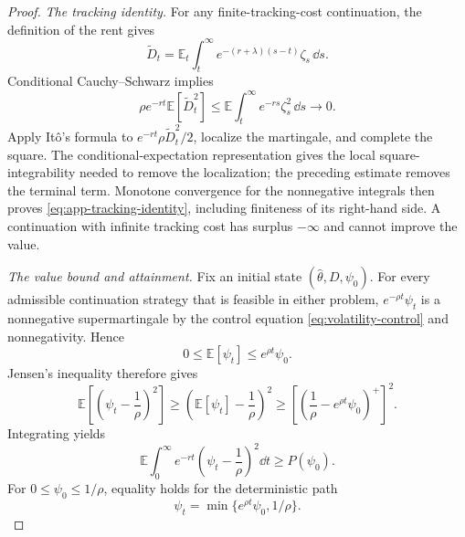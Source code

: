 \documentclass[12pt]{article}
\newcommand{\E}{\mathbb{E}}
\newcommand{\hth}{\hat\theta}
\begin{document}
\begin{proof}

\emph{The tracking identity.}
For any finite-tracking-cost continuation, the definition of the rent gives
\[
  \widetilde D_t
  =\E_t\int_t^\infty e^{-(r+\lambda)(s-t)}\zeta_s\,\dd s.
\]
Conditional Cauchy--Schwarz implies
\[
  \rho e^{-rt}\E[\widetilde D_t^2]
  \leq \E\int_t^\infty e^{-rs}\zeta_s^2\,\dd s
  \longrightarrow0.
\]
Apply It\^o's formula to \(e^{-rt}\rho\widetilde D_t^2/2\), localize
the martingale, and complete the square. The conditional-expectation
representation gives the local square-integrability needed to remove
the localization; the preceding estimate removes the terminal term.
Monotone convergence for the nonnegative integrals then proves
\eqref{eq:app-tracking-identity}, including finiteness of its right-hand
side. A continuation with infinite tracking cost has surplus
\(-\infty\) and cannot improve the value.

\emph{The value bound and attainment.}
Fix an initial state \((\hth,D,\psi_0)\).
For every admissible continuation strategy that is feasible in either problem,
\(
  e^{-\rho t}\psi_t
\)
is a nonnegative supermartingale by the control equation
\eqref{eq:volatility-control} and nonnegativity. Hence
\[
  0\leq\E[\psi_t]\leq e^{\rho t}\psi_0.
\]
Jensen's inequality therefore gives
\begin{equation}\label{eq:app-volatility-bound}
  \E\left[\left(\psi_t-\frac1\rho\right)^2\right]
  \geq
  \left(\E[\psi_t]-\frac1\rho\right)^2
  \geq
  \left[\left(\frac1\rho-e^{\rho t}\psi_0\right)^+\right]^2.
\end{equation}
Integrating yields
\[
  \E\int_0^\infty e^{-rt}
    \left(\psi_t-\frac1\rho\right)^2\dd t
  \geq P(\psi_0).
\]
For \(0\leq\psi_0\leq1/\rho\), equality holds for the deterministic path
\begin{equation}\label{eq:app-optimal-volatility}
  \psi_t=\min\{e^{\rho t}\psi_0,1/\rho\}.
\end{equation}


\end{proof}
\end{document}
